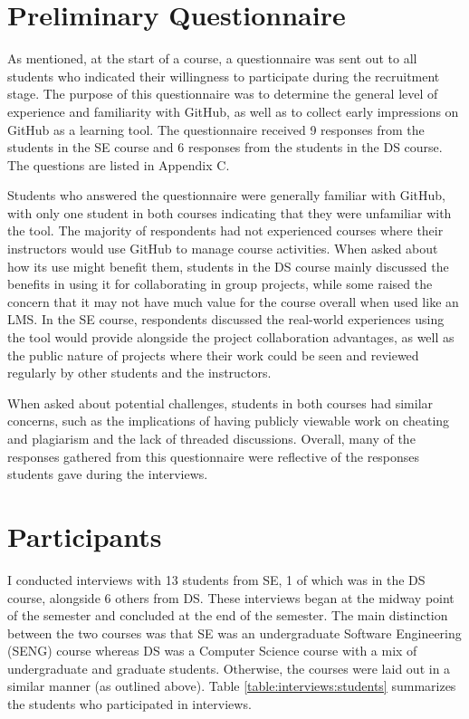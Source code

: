
\section{Preliminary Questionnaire}
As mentioned, at the start of a course, a questionnaire was sent out to all students who indicated their willingness to participate during the recruitment stage. The purpose of this questionnaire was to determine the general level of experience and familiarity with GitHub, as well as to collect early impressions on GitHub as a learning tool. The questionnaire received 9 responses from the students in the SE course and 6 responses from the students in the DS course. The questions are listed in Appendix C.

Students who answered the questionnaire were generally familiar with GitHub, with only one student in both courses indicating that they were unfamiliar with the tool. The majority of respondents had not experienced courses where their instructors would use GitHub to manage course activities. When asked about how its use might benefit them, students in the DS course mainly discussed the benefits in using it for collaborating in group projects, while some raised the concern that it may not have much value for the course overall when used like an LMS. In the SE course, respondents discussed the real-world experiences using the tool would provide alongside the project collaboration advantages, as well as the public nature of projects where their work could be seen and reviewed regularly by other students and the instructors.

When asked about potential challenges, students in both courses had similar concerns, such as the implications of having publicly viewable work on cheating and plagiarism and the lack of threaded discussions. Overall, many of the responses gathered from this questionnaire were reflective of the responses students gave during the interviews.

\section{Participants}
I conducted interviews with 13 students from SE, 1 of which was in the DS course, alongside 6 others from DS. These interviews began at the midway point of the semester and concluded at the end of the semester. The main distinction between the two courses was that SE was an undergraduate Software Engineering (SENG) course whereas DS was a Computer Science course with a mix of undergraduate and graduate students. Otherwise, the courses were laid out in a similar manner (as outlined above). Table \ref{table:interviews:students} summarizes the students who participated in interviews.

